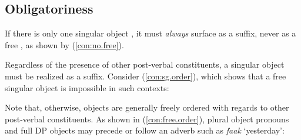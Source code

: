 \documentclass[output=paper,
modfonts
]{langscibook}
\begin{document}
\subsection{Obligatoriness}\label{sec:baier:3.1}

If there is only one singular object , it must \textit{always} surface as a suffix, never as a free , as shown by (\ref{con:no.free}). 

\begin{exe} 
\ex \label{con:no.free}
\begin{xlista}

\end{xlista}
\end{exe}

\noindent Regardless of the presence of other post-verbal constituents, a singular 
object  must be realized as a suffix. Consider (\ref{con:sg.order}), which shows that a free singular object  is impossible in such contexts:

\begin{exe} 
\ex \label{con:sg.order}
\begin{xlista}


\end{xlista}
\end{exe}

\noindent Note that, otherwise, objects are generally freely ordered with regards to other post-verbal constituents. As shown in (\ref{con:free.order}), plural object pronouns and full DP objects may precede or follow an adverb such as \textit{faak} `yesterday':
\end{document}

